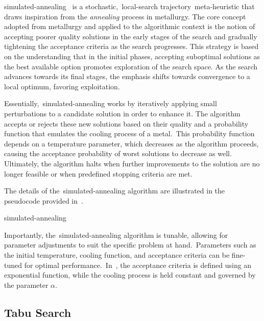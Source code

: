 \acrfull{simulated-annealing}~\cite{kirkpatrick1983optimization,nikolaev2010simulateda,eglese1990simulated}
is a stochastic,~\acrshort{local-search} trajectory~\acrshort{meta-heuristic}
that draws inspiration from the \emph{annealing} process in metallurgy. The core
concept adopted from metallurgy and applied to the algorithmic context is the
notion of accepting poorer quality solutions in the early stages of the search
and gradually tightening the acceptance criteria as the search progresses. This
strategy is based on the understanding that in the initial phases, accepting
suboptimal solutions as the best available option promotes exploration of the
search space. As the search advances towards its final stages, the emphasis
shifts towards convergence to a local optimum, favoring exploitation.

Essentially,~\acrshort{simulated-annealing} works by iteratively applying small
perturbations to a candidate solution in order to enhance it. The algorithm
accepts or rejects these new solutions based on their quality and a probability
function that emulates the cooling process of a metal.~This probability function
depends on a temperature parameter, which decreases as the algorithm proceeds,
causing the acceptance probability of worst solutions to decrease as well.
Ultimately, the algorithm halts when further improvements to the solution are no
longer feasible or when predefined stopping criteria are met.

The details of the~\acrshort{simulated-annealing} algorithm are illustrated in the
pseudocode provided in~.

\begin{algorithm}
  
  \caption{\acrlong{simulated-annealing}}
  \label{algorithm:simulated-annealing}
\end{algorithm}

Importantly, the~\acrshort{simulated-annealing} algorithm is tunable, allowing
for parameter adjustments to suit the specific problem at hand.~Parameters such
as the initial temperature, cooling function, and acceptance criteria can be
fine-tuned for optimal performance.~In~, the
acceptance criteria is defined using an exponential function, while the cooling
process is held constant and governed by the parameter $\alpha$.

\subsection{Tabu Search}
\label{subsec:tabu-search}

